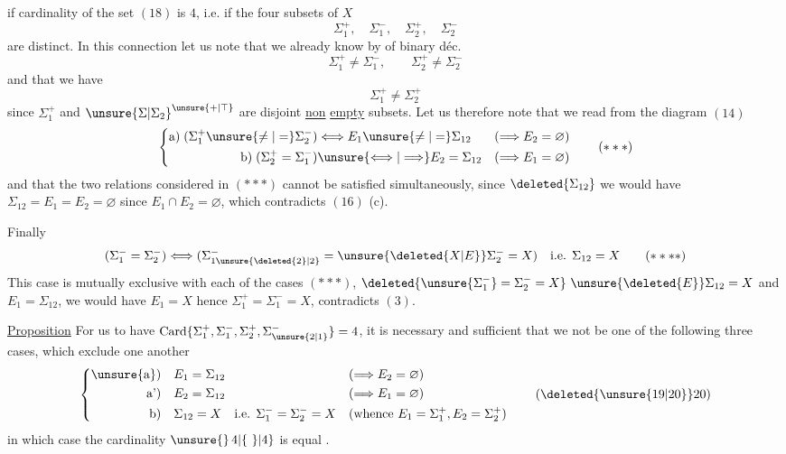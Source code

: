 \begingroup\makeatletter\tagsleft@true\makeatother
if  cardinality of the set $(18)$ is $4$, i.e. if the four subsets of $X$
\[
\Sigma_1^+,\quad\Sigma_1^-,\quad\Sigma_2^+,\quad\Sigma_2^-
\]
are distinct. In this connection let us note that we already know by   of binary déc.
\[
\Sigma_1^+\ne\Sigma_1^-,\qquad\Sigma_2^+\ne\Sigma_2^-
\tag*{($*$)}
\]
and that we have
\[
\Sigma_1^+\ne\Sigma_2^+
\tag*{($**$)}
\]
since $\Sigma_1^+$ and $\unsure{\Sigma|\Sigma_2}^{\unsure{+|\top}}$ are disjoint \uline{non} \uline{empty} subsets. Let us therefore note that we read from the diagram $(14)$
\[
\left\{\begin{aligned}
\text{a)}\;(\Sigma_1^+\unsure{\ne|=}\Sigma_2^-)&\Longleftrightarrow E_1\unsure{\ne|=}\Sigma_{12}
   &(\Longrightarrow E_2=\varnothing)\\
\text{b)}\;(\Sigma_2^+=\Sigma_1^-)&\unsure{\Longleftrightarrow|\Longrightarrow} E_2=\Sigma_{12}
   &(\Longrightarrow E_1=\varnothing)
\end{aligned}\right.
\tag*{($***$)}
\]
and that the two relations  considered in $(***)$ cannot be satisfied simultaneously, since $\deleted{\Sigma_{12}}$ we would have $\Sigma_{12}=E_1=E_2=\varnothing$ since $E_1\cap E_2=\varnothing$, which contradicts $(16)$ (c).

Finally
\[
(\Sigma_1^-=\Sigma_2^-)\Longleftrightarrow
(\Sigma_{1\unsure{\deleted{2}|2}}^-=\unsure{\deleted{X|E}}\Sigma_2^-=X)
\quad\text{i.e. }\Sigma_{12}=X
\tag*{($****$)}
\]
This case is mutually exclusive with each of the cases $(***)$,   $\deleted{\unsure{\Sigma_1^-}=\Sigma_2^-=X}\ \unsure{\deleted{E}}\Sigma_{12}=X$ and $E_1=\Sigma_{12}$, we would have $E_1=X$ hence $\Sigma_1^+=\Sigma_1^-=X$,  contradicts $(3)$.

\uline{Proposition} For us to have $\operatorname{Card}\{\Sigma_1^+,\Sigma_1^-,\Sigma_2^+,\Sigma_{\unsure{2|1}}^-\}=4$, it is necessary and sufficient that we not be one of the following three cases, which exclude one another
\[
\left\{\begin{aligned}
\text{\unsure{a})}\quad &E_1=\Sigma_{12}&&(\Longrightarrow E_2=\varnothing)\\
\text{a')}\quad &E_2=\Sigma_{12}&&(\Longrightarrow E_1=\varnothing)\\
\text{b)}\quad &\Sigma_{12}=X\quad\text{i.e. }\Sigma_1^-=\Sigma_2^-=X
   &&(\text{whence }E_1=\Sigma_1^+,E_2=\Sigma_2^+)
\end{aligned}\right.
\tag*{(\deleted{\unsure{19|20}}20)}
\]
in which case the cardinality  $\unsure{\}\,4|\{\ \}|4}$ is equal  .

\endgroup
\clearpage
